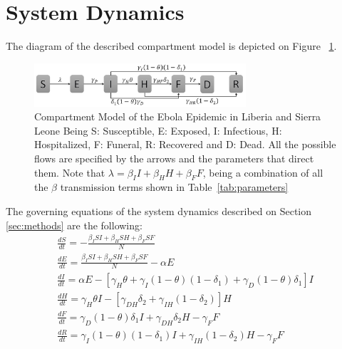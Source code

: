 \documentclass[10pt]{article}
\begin{document}
 

%



\section{System Dynamics}

The diagram of the described compartment model is depicted on Figure ~\ref{fig:compartment}. \\


\begin{figure}[!h]
  \centering
  \includegraphics[width=0.7\textwidth]{compartment}
  \caption{Compartment Model of the Ebola Epidemic in Liberia and Sierra Leone \newline  Being S: Susceptible, E: Exposed, I: Infectious, H: Hospitalized, F: Funeral,  R: Recovered and D: Dead. All the possible flows are specified by the arrows and the parameters that direct them. Note that $\lambda = \beta_{I}I+\beta_{H}H+\beta_{F}F $, being a combination of all the $\beta$ transmission terms shown in Table~\ref{tab:parameters}} 
\label{fig:compartment} 
\end{figure}

 
 The governing equations of the system dynamics described on Section \ref{sec:methods} are the following: \\

\begin{eqnarray} 
\label{SDeqn}
\frac{dS}{dt} = - \frac{\beta_{I}SI+\beta_{H}SH+\beta_{F}SF}{N}\\
\frac{dE}{dt} =  \frac{\beta_{I}SI+\beta_{H}SH+\beta_{F}SF}{N}-\alpha E\\
\frac{dI}{dt} =  \alpha E - [\gamma_{H}\theta + \gamma_{I}(1-\theta)(1-\delta_{1})+\gamma_{D}(1-\theta)\delta_{1}]I\\
\frac{dH}{dt} = \gamma_{H}\theta I - [\gamma_{DH}\delta_{2}+\gamma_{IH}(1-\delta_{2})]H\\
\frac{dF}{dt} = \gamma_{D}(1-\theta) \delta_{1} I + \gamma_{DH}\delta_{2} H-\gamma_{F} F\\
\frac{dR}{dt} = \gamma_{I}(1-\theta)(1- \delta_{1}) I + \gamma_{IH}(1-\delta_{2}) H-\gamma_{F} F
\end{eqnarray}\\
\end{document}
